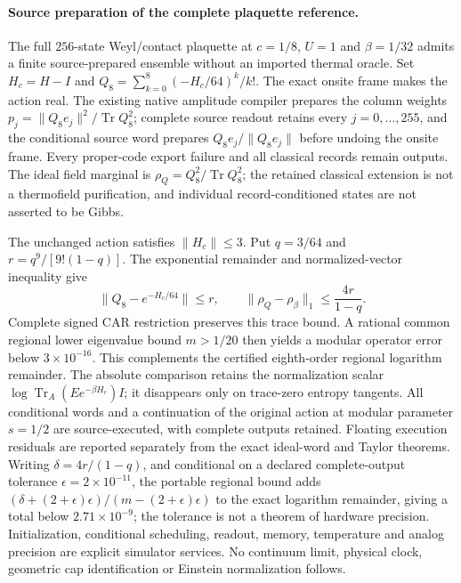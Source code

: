 \paragraph{Source preparation of the complete plaquette reference.}
The full $256$-state Weyl/contact plaquette at $c=1/8$, $U=1$ and
$\beta=1/32$ admits a finite source-prepared ensemble without an imported
thermal oracle. Set $H_c=H-I$ and
$Q_8=\sum_{k=0}^{8}(-H_c/64)^k/k!$. The exact onsite frame makes the
action real. The existing native amplitude compiler prepares the column
weights $p_j=\|Q_8e_j\|^2/\operatorname{Tr}Q_8^2$; complete source
readout retains every $j=0,\ldots,255$, and the conditional source word
prepares $Q_8e_j/\|Q_8e_j\|$ before undoing the onsite frame. Every
proper-code export failure and all classical records remain outputs.
The ideal field marginal is $\rho_Q=Q_8^2/\operatorname{Tr}Q_8^2$; the
retained classical extension is not a thermofield purification, and
individual record-conditioned states are not asserted to be Gibbs.

The unchanged action satisfies $\|H_c\|\leq3$. Put $q=3/64$ and
$r=q^9/[9!(1-q)]$. The exponential remainder and normalized-vector
inequality give
\[
 \|Q_8-e^{-H_c/64}\|\leq r,\qquad
 \|\rho_Q-\rho_\beta\|_1\leq\frac{4r}{1-q}.
\]
Complete signed CAR restriction preserves this trace bound. A rational
common regional lower eigenvalue bound $m>1/20$ then yields a modular
operator error below $3\times10^{-16}$. This complements the
certified eighth-order regional logarithm remainder. The absolute
comparison retains the normalization scalar
$\log\operatorname{Tr}_A(Ee^{-\beta H_c})I$; it disappears only on
trace-zero entropy tangents. All conditional words and a continuation of
the original action at modular parameter $s=1/2$ are source-executed,
with complete outputs retained. Floating execution residuals are reported
separately from the exact ideal-word and Taylor theorems.
Writing $\delta=4r/(1-q)$, and conditional on a declared complete-output
tolerance $\epsilon=2\times10^{-11}$,
the portable regional bound adds
$(\delta+(2+\epsilon)\epsilon)/(m-(2+\epsilon)\epsilon)$ to the
exact logarithm remainder, giving a total below $2.71\times10^{-9}$;
the tolerance is not a theorem of hardware precision. Initialization,
conditional scheduling, readout, memory, temperature and analog precision
are explicit simulator services. No continuum limit, physical clock,
geometric cap identification or Einstein normalization follows.
